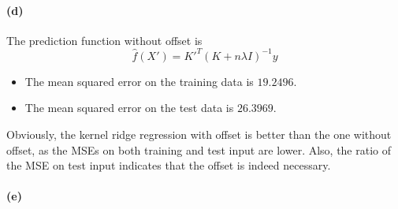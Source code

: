 \documentclass[12pt]{article}
\begin{document}
\paragraph{(d)}
The prediction function without offset is
\[ \hat{f}(X')=K'^{T}(K+n\lambda I)^{-1}y \]
\begin{itemize}
    \item The mean squared error on the training data is \(19.2496\).
    \item The mean squared error on the test data is \(26.3969\).
\end{itemize}
Obviously, the kernel ridge regression with offset is better than the one without offset, as the MSEs on both training and test input are lower.
Also, the ratio of the MSE on test input indicates that the offset is indeed necessary.

\paragraph{(e)}
\inputminted[frame=single,framesep=10pt,linenos,xleftmargin=\parindent]{octave}{./hw4/problem2/krr.m}
\end{document}
